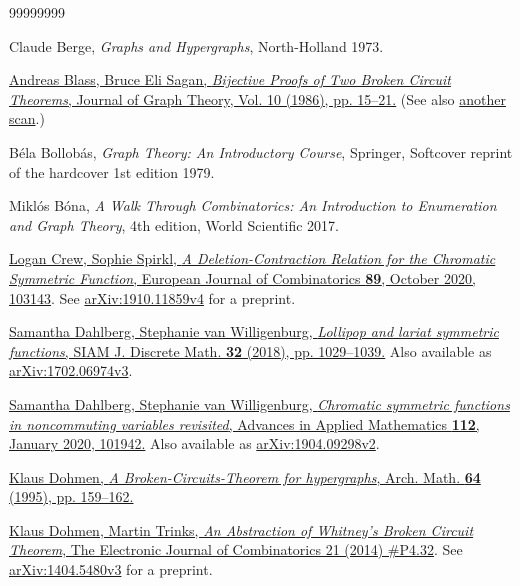 \documentclass[numbers=enddot,12pt,final,onecolumn,notitlepage]{scrartcl}%
\theoremstyle{definition}
\begin{document}
\begin{thebibliography}{99999999}                                                                                         %


Claude Berge, \textit{Graphs and Hypergraphs},
North-Holland 1973.

%
\href{http://users.math.msu.edu/users/sagan/Papers/Old/bpt.pdf}{Andreas Blass,
Bruce Eli Sagan, \textit{Bijective Proofs of Two Broken Circuit Theorems},
Journal of Graph Theory, Vol. 10 (1986), pp. 15--21.} (See also
\href{https://www.math.ucdavis.edu/~deloera/MISC/BIBLIOTECA/trunk/Sagan2.pdf}{another
scan}.)

B\'{e}la Bollob\'{a}s, \textit{Graph Theory: An
Introductory Course}, Springer, Softcover reprint of the hardcover 1st edition 1979.

Mikl\'{o}s B\'{o}na, \textit{A Walk Through
Combinatorics: An Introduction to Enumeration and Graph Theory}, 4th edition,
World Scientific 2017.

%
\href{https://doi.org/10.1016/j.ejc.2020.103143}{Logan Crew, Sophie Spirkl,
\textit{A Deletion-Contraction Relation for the Chromatic Symmetric Function},
European Journal of Combinatorics \textbf{89}, October 2020, 103143}. See
\href{https://arxiv.org/abs/1910.11859v4}{arXiv:1910.11859v4} for a preprint.

\href{https://doi.org/10.1137/17M1144805}{Samantha
Dahlberg, Stephanie van Willigenburg, \textit{Lollipop and lariat symmetric
functions}, SIAM J. Discrete Math. \textbf{32} (2018), pp. 1029--1039.} Also
available as \href{https://arxiv.org/abs/1702.06974v3}{arXiv:1702.06974v3}.

%
\href{https://doi.org/10.1016/j.aam.2019.101942}{Samantha Dahlberg, Stephanie
van Willigenburg, \textit{Chromatic symmetric functions in noncommuting
variables revisited}, Advances in Applied Mathematics \textbf{112}, January
2020, 101942.} Also available as
\href{https://arxiv.org/abs/1904.09298v2}{arXiv:1904.09298v2}.

\href{https://doi.org/10.1007/BF01196637}{Klaus
Dohmen, \textit{A Broken-Circuits-Theorem for hypergraphs}, Arch. Math.
\textbf{64} (1995), pp. 159--162.}

\href{https://doi.org/10.37236/4356}{Klaus Dohmen,
Martin Trinks, \textit{An Abstraction of Whitney's Broken Circuit Theorem},
The Electronic Journal of Combinatorics 21 (2014) \#P4.32}. See
\href{https://arxiv.org/abs/1404.5480v3}{arXiv:1404.5480v3} for a preprint.


\end{thebibliography}
\end{document}
